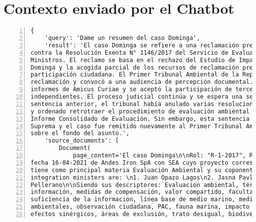 
\chapter{Contexto enviado por el Chatbot}\label{appx:contexto}

\begin{Verbatim}[frame=lines, label=Elavoración propia -  Ejemplo de Contexto enviado por el Chatbot a OpenAI
				, fontsize=\scriptsize, numbers=left
				, baselinestretch=0.4
				, formatcom=\color{gray}]
{
    'query': 'Dame un resumen del caso Dominga',
    'result': 'El caso Dominga se refiere a una reclamación presentada por Andes Iron SpA
contra la Resolución Exenta N° 1146/2017 del Servicio de Evaluación Ambiental y el Comité de
Ministros. El reclamo se basa en el rechazo del Estudio de Impacto Ambiental del proyecto
Dominga y la acogida parcial de los recursos de reclamación presentados en el marco de la
participación ciudadana. El Primer Tribunal Ambiental de la República de Chile admitió la
reclamación y convocó a una audiencia de percepción documental. Además, se presentaron
informes de Amicus Curiae y se aceptó la participación de terceros coadyuvantes e
independientes. El proceso judicial continúa y se espera una sentencia definitiva. En una
sentencia anterior, el tribunal había anulado varias resoluciones relacionadas con el proyecto
y ordenado retrotraer el procedimiento de evaluación ambiental a una etapa posterior al
Informe Consolidado de Evaluación. Sin embargo, esta sentencia fue anulada por la Corte
Suprema y el caso fue remitido nuevamente al Primer Tribunal Ambiental para que se pronuncie
sobre el fondo del asunto.',
    'source_documents': [
        Document(
            page_content='El caso Dominga\n\nRol: "R-1-2017", Rol: "R-1-2017",Rol: "R-1-2017",
fecha 16-04-2021 de Andes Iron SpA con SEA cuyo proyecto corresponde a Dominga. Este caso
tiene como principal materia Evaluación Ambiental y su coponente ambiental es Agua\n\nThe
integration ministers are: \n1. Juan Opazo Lagos\n2. Jasna Pavlich Núñez\n3. Fabrizio Queirolo
Pellerano\n\nSiendo sus descriptores: Evaluación ambiental, término anticipado, suficiencia de
información, medidas de compensación, valor compartido, facultades del Comité de Ministros,
suficiencia de la información, línea base de medio marino, medida voluntaria, riesgos
ambientales, observación ciudadana, PAC, fauna marina, impacto de ruidos, rutas de navegación,
efectos sinérgicos, áreas de exclusión, trato desigual, biodiversidad marina, pingüino

\end{Verbatim}
